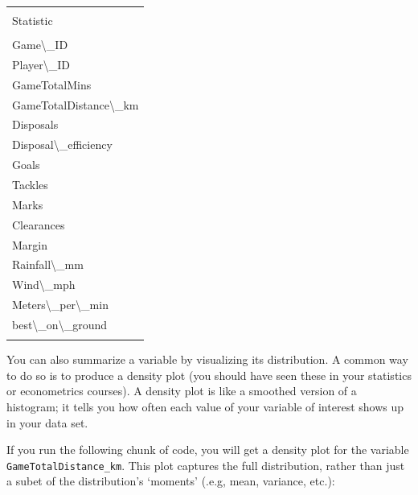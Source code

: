 \documentclass[
]{article}
\newenvironment{Shaded}{\begin{snugshade}}{\end{snugshade}}
\newcommand{\AttributeTok}[1]{\textcolor[rgb]{0.77,0.63,0.00}{#1}}
\newcommand{\FunctionTok}[1]{\textcolor[rgb]{0.00,0.00,0.00}{#1}}
\newcommand{\NormalTok}[1]{#1}
\newcommand{\SpecialCharTok}[1]{\textcolor[rgb]{0.00,0.00,0.00}{#1}}
\newcommand{\StringTok}[1]{\textcolor[rgb]{0.31,0.60,0.02}{#1}}
\begin{document}
\begin{longtable}[]{@{}
  >{\raggedright\arraybackslash}p{}@{}}
\toprule()
\endhead
 \\
Statistic \\
 \\
Game\textbackslash\_ID \\
Player\textbackslash\_ID \\
GameTotalMins \\
GameTotalDistance\textbackslash\_km \\
Disposals \\
Disposal\textbackslash\_efficiency \\
Goals \\
Tackles \\
Marks \\
Clearances \\
Margin \\
Rainfall\textbackslash\_mm \\
Wind\textbackslash\_mph \\
Meters\textbackslash\_per\textbackslash\_min \\
best\textbackslash\_on\textbackslash\_ground \\
 \\
\bottomrule()
\end{longtable}

You can also summarize a variable by visualizing its distribution. A
common way to do so is to produce a density plot (you should have seen
these in your statistics or econometrics courses). A density plot is
like a smoothed version of a histogram; it tells you how often each
value of your variable of interest shows up in your data set.

If you run the following chunk of code, you will get a density plot for
the variable \texttt{GameTotalDistance\_km}. This plot captures the full
distribution, rather than just a subet of the distribution's `moments'
(.e.g, mean, variance, etc.):

\begin{Shaded}
\end{Shaded}
\end{document}
